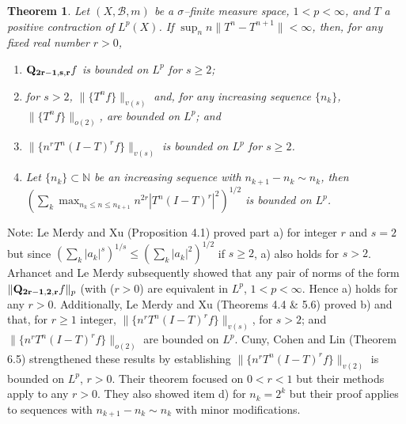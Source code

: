 \documentclass[11pt]{amsart}
\newtheorem{thm}{Theorem}[section]
\theoremstyle{definition}
\theoremstyle{remark}
\begin{document}
\begin{thm} \label{thm:LeM} Let $(X,\mathcal B,m)$ be a $\sigma$--finite measure space, $1<p<\infty$, and $T$ a positive contraction of $L^p(X)$. 
If $\sup_n n \lVert T^n-T^{n+1} \rVert<\infty$, then, for any fixed real number $r> 0$, 
\begin{enumerate}
\item    ${\bf Q_{2r-1,s,r}}f$               %
 is bounded on $L^p$ for $s\ge 2$;
\item for $s>2$, $\lVert \{T^nf\} \rVert_{v(s)}$ and, for any increasing sequence $\{n_k\}$, $\lVert \{T^nf\} \rVert_{o(2)}$, are bounded on $L^p$; and
\item $\lVert \{n^r T^n(I-T)^r f\} \rVert_{v(s)}$  is bounded on $L^p$ for $s\ge 2$.
\item Let $\{n_k\}\subset \mathbb N$ be an increasing sequence with $n_{k+1}-n_k \sim n_k$, then\\ $\left( \sum_k \max_{n_k\le n\le n_{k+1}} n^{2r}|T^n(I-T)^r|^2 \right)^{1/2}$ is bounded on $L^p$.
\end{enumerate}
\end{thm} 

Note: 
Le Merdy and Xu \cite{LeMX-Vq} (Proposition 4.1) proved part a) for integer $r$ and $s=2$ but since $(\sum_k |a_k|^s)^{1/s} \le (\sum_k |a_k|^2)^{1/2}$ if $s\ge 2$, a) also holds for $s>2$.
Arhancet and Le Merdy \cite{ALeM} subsequently showed that any pair of norms of the form $\lVert {\bf Q_{2r-1,2,r}}f\rVert_p$ (with ($r>0$) are equivalent in $L^p$, $1<p<\infty$. 
Hence a) holds for any $r>0$.
Additionally, Le Merdy and Xu \cite{LeMX-Vq} (Theorems 4.4 \& 5.6) proved b) and that,
 for $r\ge 1$ integer, $\lVert \{n^r T^n(I-T)^r f\} \rVert_{v(s)}$, for $s>2$; and $\lVert \{n^r T^n(I-T)^r f\} \rVert_{o(2)}$ are bounded on $L^p$.
Cuny, Cohen and Lin \cite{CCL} (Theorem 6.5) strengthened these results by establishing $\lVert \{n^r T^n(I-T)^r f\} \rVert_{v(2)}$ is  bounded on $L^p$, $r>0$. Their theorem focused on $0<r<1$ but their methods apply to any $r>0$. They also showed item d) for $n_k=2^k$ but their proof applies to sequences with $n_{k+1}-n_k \sim n_k$ with minor modifications.
\end{document}
